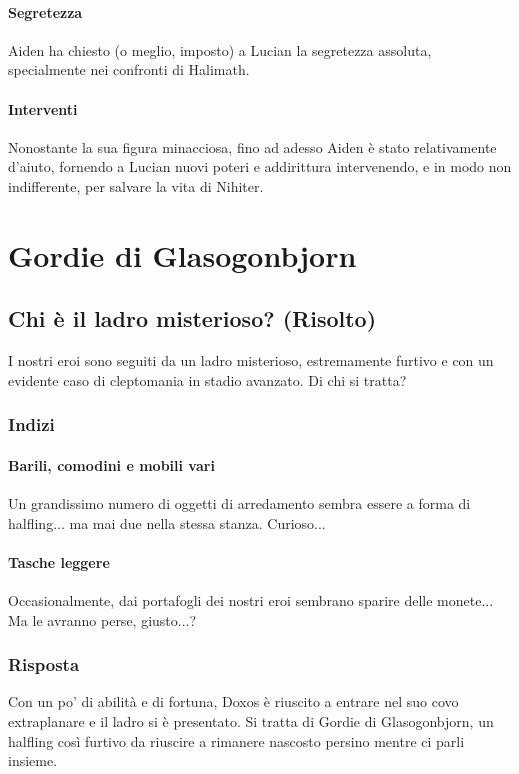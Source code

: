 \documentclass[letterpaper,twocolumn,openany,nodeprecatedcode]{dndbook}
\begin{document}
\paragraph{Segretezza} Aiden ha chiesto (o meglio, imposto) a Lucian la segretezza assoluta, specialmente nei confronti di Halimath.
\paragraph{Interventi} Nonostante la sua figura minacciosa, fino ad adesso Aiden è stato relativamente d'aiuto, fornendo a Lucian nuovi poteri e addirittura intervenendo, e in modo non indifferente, per salvare la vita di Nihiter.

\section{Gordie di Glasogonbjorn}

\subsection{Chi è il ladro misterioso? (Risolto)}
I nostri eroi sono seguiti da un ladro misterioso, estremamente furtivo e con un evidente caso di cleptomania in stadio avanzato. Di chi si tratta?

\subsubsection{Indizi}
\paragraph{Barili, comodini e mobili vari} Un grandissimo numero di oggetti di arredamento sembra essere a forma di halfling... ma mai due nella stessa stanza. Curioso...
\paragraph{Tasche leggere} Occasionalmente, dai portafogli dei nostri eroi sembrano sparire delle monete... Ma le avranno perse, giusto...?

\subsubsection{Risposta}
Con un po' di abilità e di fortuna, Doxos è riuscito a entrare nel suo covo extraplanare e il ladro si è presentato. Si tratta di Gordie di Glasogonbjorn, un halfling così furtivo da riuscire a rimanere nascosto persino mentre ci parli insieme.
\end{document}
